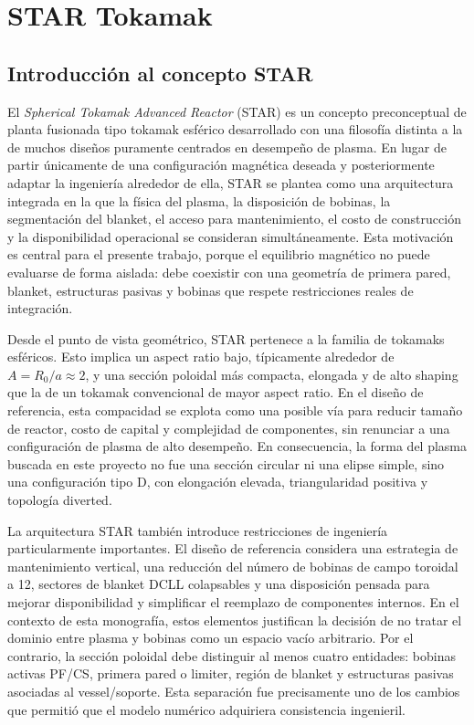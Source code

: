 \documentclass[11pt,a4paper]{article}
\begin{document}

\section{STAR Tokamak}
\label{sec:star_tokamak}

\subsection{Introducción al concepto STAR}
El \emph{Spherical Tokamak Advanced Reactor} (STAR) es un concepto preconceptual de planta
fusionada tipo tokamak esférico desarrollado con una filosofía distinta a la de muchos diseños
puramente centrados en desempeño de plasma. En lugar de partir únicamente de una configuración
magnética deseada y posteriormente adaptar la ingeniería alrededor de ella, STAR se plantea como
una arquitectura integrada en la que la física del plasma, la disposición de bobinas, la segmentación
del blanket, el acceso para mantenimiento, el costo de construcción y la disponibilidad operacional
se consideran simultáneamente. Esta motivación es central para el presente trabajo, porque el
equilibrio magnético no puede evaluarse de forma aislada: debe coexistir con una geometría de
primera pared, blanket, estructuras pasivas y bobinas que respete restricciones reales de integración.

Desde el punto de vista geométrico, STAR pertenece a la familia de tokamaks esféricos. Esto implica
un aspect ratio bajo, típicamente alrededor de $A=R_0/a\approx 2$, y una sección poloidal más
compacta, elongada y de alto shaping que la de un tokamak convencional de mayor aspect ratio. En
el diseño de referencia, esta compacidad se explota como una posible vía para reducir tamaño de
reactor, costo de capital y complejidad de componentes, sin renunciar a una configuración de plasma
de alto desempeño. En consecuencia, la forma del plasma buscada en este proyecto no fue una
sección circular ni una elipse simple, sino una configuración tipo D, con elongación elevada,
triangularidad positiva y topología diverted.

La arquitectura STAR también introduce restricciones de ingeniería particularmente importantes.
El diseño de referencia considera una estrategia de mantenimiento vertical, una reducción del número
de bobinas de campo toroidal a 12, sectores de blanket DCLL colapsables y una disposición pensada
para mejorar disponibilidad y simplificar el reemplazo de componentes internos. En el contexto de
esta monografía, estos elementos justifican la decisión de no tratar el dominio entre plasma y bobinas
como un espacio vacío arbitrario. Por el contrario, la sección poloidal debe distinguir al menos cuatro
entidades: bobinas activas PF/CS, primera pared o limiter, región de blanket y estructuras pasivas
asociadas al vessel/soporte. Esta separación fue precisamente uno de los cambios que permitió que el
modelo numérico adquiriera consistencia ingenieril.
\end{document}
